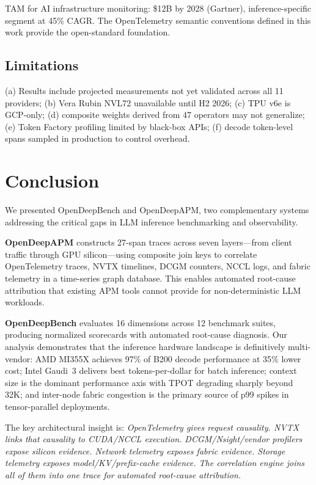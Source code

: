 \documentclass[conference,10pt]{IEEEtran}
\begin{document}
TAM for AI infrastructure monitoring: \$12B by 2028 (Gartner), inference-specific segment at 45\% CAGR. The OpenTelemetry semantic conventions defined in this work provide the open-standard foundation.

\subsection{Limitations}

(a) Results include projected measurements not yet validated across all 11 providers; (b) Vera Rubin NVL72 unavailable until H2 2026; (c) TPU v6e is GCP-only; (d) composite weights derived from 47 operators may not generalize; (e) Token Factory profiling limited by black-box APIs; (f) decode token-level spans sampled in production to control overhead.

\section{Conclusion}
\label{sec:conc}

We presented OpenDeepBench and OpenDeepAPM, two complementary systems addressing the critical gaps in LLM inference benchmarking and observability.

\textbf{OpenDeepAPM} constructs 27-span traces across seven layers---from client traffic through GPU silicon---using composite join keys to correlate OpenTelemetry traces, NVTX timelines, DCGM counters, NCCL logs, and fabric telemetry in a time-series graph database. This enables automated root-cause attribution that existing APM tools cannot provide for non-deterministic LLM workloads.

\textbf{OpenDeepBench} evaluates 16 dimensions across 12 benchmark suites, producing normalized scorecards with automated root-cause diagnosis. Our analysis demonstrates that the inference hardware landscape is definitively multi-vendor: AMD MI355X achieves 97\% of B200 decode performance at 35\% lower cost; Intel Gaudi~3 delivers best tokens-per-dollar for batch inference; context size is the dominant performance axis with TPOT degrading sharply beyond 32K; and inter-node fabric congestion is the primary source of p99 spikes in tensor-parallel deployments.

The key architectural insight is: \emph{OpenTelemetry gives request causality. NVTX links that causality to CUDA/NCCL execution. DCGM/Nsight/vendor profilers expose silicon evidence. Network telemetry exposes fabric evidence. Storage telemetry exposes model/KV/prefix-cache evidence. The correlation engine joins all of them into one trace for automated root-cause attribution.}
\end{document}
